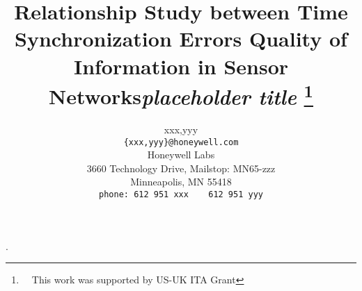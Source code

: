 \documentclass[10pt,twocolumn]{main}
\title{{\bf Relationship Study between Time Synchronization Errors Quality of Information in Sensor Networks{\it placeholder title}}
\thanks{~~This work was supported by US-UK ITA Grant}}
\author{{\sc xxx},{\sc yyy}\\
\normalsize{\tt \{xxx,yyy\}@honeywell.com}\\
\normalsize{Honeywell Labs} \\
\normalsize{3660 Technology Drive, Mailstop: MN65-zzz}\\
\normalsize{Minneapolis, MN 55418}\\
\normalsize{\tt phone: 612 951 xxx $\quad$ 612 951 yyy}\\
}
\begin{document}
\maketitle
\newtheorem{theorem}{Theorem}
\newtheorem{assumption}{Assumption}
.\normalbaselineskip


%

                                                                          

%
%


\end{document}
